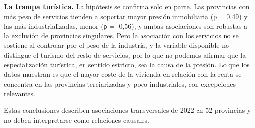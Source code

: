 \documentclass[econometrics,article,submit,moreauthors,pdftex]{Definitions/mdpi}
\begin{document}
\textbf{La trampa turística.} La hipótesis se confirma solo en parte.
Las provincias con más peso de servicios tienden a soportar mayor
presión inmobiliaria (ρ = 0,49) y las más industrializadas, menor (ρ =
-0,56), y ambas asociaciones son robustas a la exclusión de provincias
singulares. Pero la asociación con los servicios no se sostiene al
controlar por el peso de la industria, y la variable disponible no
distingue el turismo del resto de servicios, por lo que no podemos
afirmar que la especialización turística, en sentido estricto, sea la
causa de la presión. Lo que los datos muestran es que el mayor coste de
la vivienda en relación con la renta se concentra en las provincias
terciarizadas y poco industriales, con excepciones relevantes.

Estas conclusiones describen asociaciones transversales de 2022 en 52
provincias y no deben interpretarse como relaciones causales.


\vspace{6pt}











\end{document}
